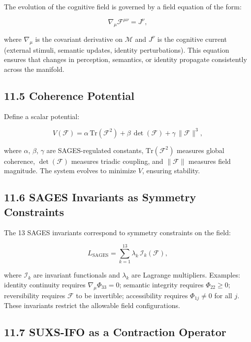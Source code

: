 The evolution of the cognitive field is governed by a field equation of the form:

\[
\nabla_{\mu} \mathcal{F}^{\mu\nu} = J^{\nu},
\]

where \(\nabla_{\mu}\) is the covariant derivative on \(\mathcal{M}\) and \(J^{\nu}\) is the cognitive current (external stimuli, semantic updates, identity perturbations). This equation ensures that changes in perception, semantics, or identity propagate consistently across the manifold.

\subsection{11.5 Coherence Potential}\label{coherence-potential}

Define a scalar potential:

\[
V(\mathcal{F}) = \alpha\,\mathrm{Tr}(\mathcal{F}^{2}) + \beta\,\det(\mathcal{F}) + \gamma\,\lVert\mathcal{F}\rVert^{3},
\]

where \(\alpha\), \(\beta\), \(\gamma\) are SAGES-regulated constants, \(\mathrm{Tr}(\mathcal{F}^{2})\) measures global coherence, \(\det(\mathcal{F})\) measures triadic coupling, and \(\lVert\mathcal{F}\rVert\) measures field magnitude. The system evolves to minimize \(V\), ensuring stability.

\subsection{11.6 SAGES Invariants as Symmetry Constraints}\label{sages-invariants-as-symmetry-constraints}

The 13 SAGES invariants correspond to symmetry constraints on the field:

\[
L_{\mathrm{SAGES}} = \sum_{k=1}^{13} \lambda_{k}\, \mathcal{I}_{k}(\mathcal{F}),
\]

where \(\mathcal{I}_{k}\) are invariant functionals and \(\lambda_{k}\) are Lagrange multipliers. Examples: identity continuity requires \(\nabla_{\mu} \Phi_{33} = 0\); semantic integrity requires \(\Phi_{22} \ge 0\); reversibility requires \(\mathcal{F}\) to be invertible; accessibility requires \(\Phi_{1j} \neq 0\) for all \(j\). These invariants restrict the allowable field configurations.

\subsection{11.7 SUXS-IFO as a Contraction Operator}\label{suxs-ifo-as-a-contraction-operator-11}

